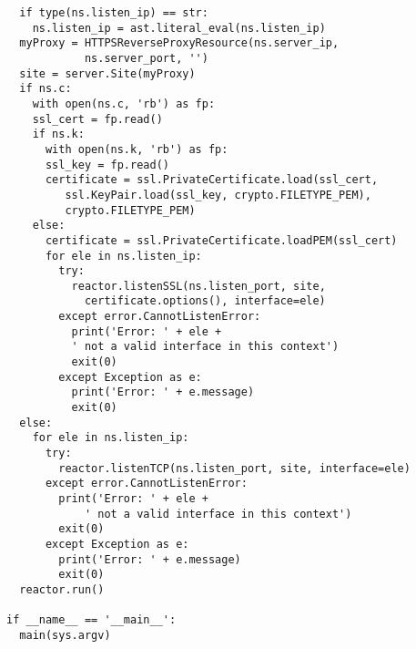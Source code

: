 \begin{lstlisting}
  if type(ns.listen_ip) == str:
    ns.listen_ip = ast.literal_eval(ns.listen_ip)
  myProxy = HTTPSReverseProxyResource(ns.server_ip, 
  			ns.server_port, '')
  site = server.Site(myProxy)
  if ns.c:
    with open(ns.c, 'rb') as fp:
    ssl_cert = fp.read()
    if ns.k:
      with open(ns.k, 'rb') as fp:
      ssl_key = fp.read()
      certificate = ssl.PrivateCertificate.load(ssl_cert,
      	 ssl.KeyPair.load(ssl_key, crypto.FILETYPE_PEM),
      	 crypto.FILETYPE_PEM)
    else:
      certificate = ssl.PrivateCertificate.loadPEM(ssl_cert)
      for ele in ns.listen_ip:
        try:
          reactor.listenSSL(ns.listen_port, site, 
          	certificate.options(), interface=ele)
        except error.CannotListenError:
          print('Error: ' + ele + 
          ' not a valid interface in this context')
          exit(0)
        except Exception as e:
          print('Error: ' + e.message)
          exit(0)
  else:
    for ele in ns.listen_ip:
      try:
        reactor.listenTCP(ns.listen_port, site, interface=ele)
      except error.CannotListenError:
        print('Error: ' + ele + 
       		' not a valid interface in this context')
        exit(0)
      except Exception as e:
        print('Error: ' + e.message)
        exit(0)
  reactor.run()

if __name__ == '__main__':
  main(sys.argv)
\end{lstlisting}

